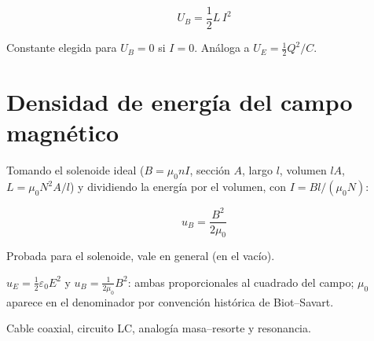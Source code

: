 \documentclass[12pt,a4paper]{article}
\begin{document}
\begin{keybox}
  \[
  \boxed{U_B = \frac{1}{2}L\,I^2}
  \]
\end{keybox}

Constante elegida para $U_B=0$ si $I=0$. Análoga a $U_E = \tfrac12 Q^2/C$.

\section{Densidad de energía del campo magnético}

Tomando el solenoide ideal ($B = \mu_0 n I$, sección $A$, largo $l$, volumen
$lA$, $L = \mu_0 N^2 A/l$) y dividiendo la energía por el volumen, con
$I = Bl/(\mu_0 N)$:

\begin{keybox}
  \[
  \boxed{u_B = \frac{B^2}{2\mu_0}}
  \]
\end{keybox}

Probada para el solenoide, vale en general (en el vacío).



\begin{notebox}[Analogía]
  $u_E = \tfrac12 \varepsilon_0 E^2$ y $u_B = \tfrac{1}{2\mu_0}B^2$: ambas
  proporcionales al cuadrado del campo; $\mu_0$ aparece en el denominador por
  convención histórica de Biot--Savart.
\end{notebox}

\begin{notebox}
  Cable coaxial, circuito LC, analogía masa--resorte y resonancia.
\end{notebox}
\end{document}
